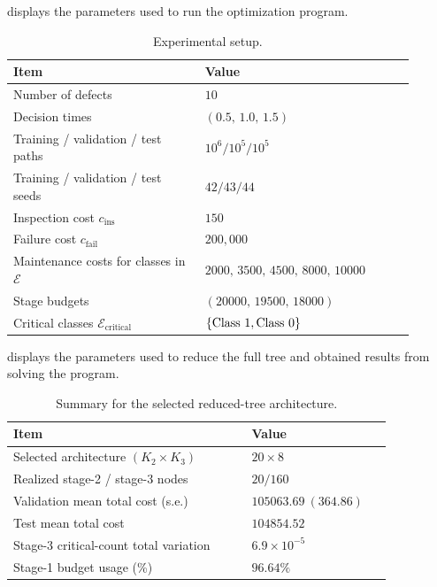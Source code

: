 \documentclass{article}
\begin{document}
 displays the parameters used to run the optimization program.
\begin{table}[htb!]
\centering
\caption{Experimental setup.} \label{tab:setup}
\begin{tabular}{p{0.43\linewidth}p{0.47\linewidth}}
\toprule
Item & Value \\
\midrule
Number of defects & \(10\) \\
Decision times & \((0.5,\,1.0,\,1.5)\) \\
Training / validation / test paths & \(10^6 / 10^5 / 10^5\) \\
Training / validation / test seeds & \(42 / 43 / 44\) \\
Inspection cost \(c_{\mathrm{ins}}\) & \(150\) \\
Failure cost \(c_{\mathrm{fail}}\) & \(200{,}000\) \\
Maintenance costs for classes in $\mathcal E$ & \(2000,\,3500,\,4500,\,8000,\,10000\) \\
Stage budgets & \((20000,\,19500,\,18000)\) \\
Critical classes $\mathcal E_{\text{critical}}$ & \(\{ \text{Class } $1$, \text{Class } $0$\}\) \\
\bottomrule
\end{tabular}
\end{table}

 displays the parameters used to reduce the full tree and obtained results from solving the program.
\begin{table}[htb!]
\centering
\caption{Summary for the selected reduced-tree architecture.} \label{tab:reduced_tree}
\begin{tabular}{p{0.55\linewidth}p{0.30\linewidth}}
\toprule
Item & Value \\
\midrule
Selected architecture $(K_2 \times K_3)$ & $20\times 8$ \\
Realized stage-2 / stage-3 nodes & $20 / 160$ \\
Validation mean total cost (s.e.) & $105063.69\ (364.86)$ \\
Test mean total cost & $104854.52$ \\
Stage-3 critical-count total variation & $6.9\times 10^{-5}$ \\
Stage-1 budget usage (\%) & $96.64\%$ \\
\bottomrule
\end{tabular}
\end{table}








 
\end{document}
